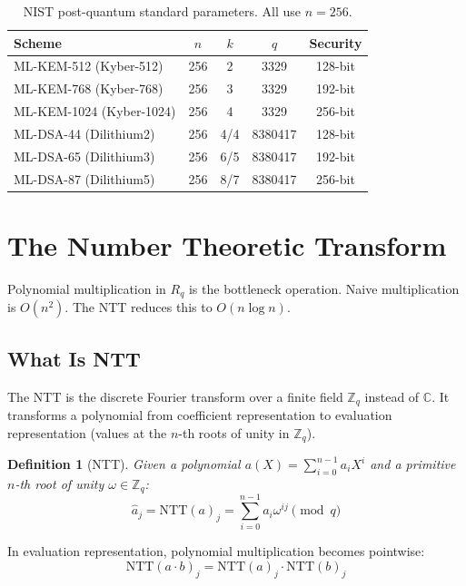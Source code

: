 \documentclass[11pt,a4paper]{article}
\newtheorem{definition}{Definition}
\begin{document}
\begin{table}[H]
\centering
\small
\begin{tabular}{@{}lcccc@{}}
\toprule
\textbf{Scheme} & $n$ & $k$ & $q$ & \textbf{Security} \\
\midrule
ML-KEM-512 (Kyber-512) & 256 & 2 & 3329 & 128-bit \\
ML-KEM-768 (Kyber-768) & 256 & 3 & 3329 & 192-bit \\
ML-KEM-1024 (Kyber-1024) & 256 & 4 & 3329 & 256-bit \\
ML-DSA-44 (Dilithium2) & 256 & 4/4 & 8380417 & 128-bit \\
ML-DSA-65 (Dilithium3) & 256 & 6/5 & 8380417 & 192-bit \\
ML-DSA-87 (Dilithium5) & 256 & 8/7 & 8380417 & 256-bit \\
\bottomrule
\end{tabular}
\caption{NIST post-quantum standard parameters. All use $n = 256$.}
\end{table}

\section{The Number Theoretic Transform}

Polynomial multiplication in $R_q$ is the bottleneck operation. Naive multiplication
is $O(n^2)$. The NTT reduces this to $O(n \log n)$.

\subsection{What Is NTT}

The NTT is the discrete Fourier transform over a finite field $\mathbb{Z}_q$ instead of
$\mathbb{C}$. It transforms a polynomial from coefficient representation to evaluation
representation (values at the $n$-th roots of unity in $\mathbb{Z}_q$).

\begin{definition}[NTT]
Given a polynomial $a(X) = \sum_{i=0}^{n-1} a_i X^i$ and a primitive $n$-th root of
unity $\omega \in \mathbb{Z}_q$:
\[
\hat{a}_j = \text{NTT}(a)_j = \sum_{i=0}^{n-1} a_i \omega^{ij} \pmod{q}
\]
\end{definition}

In evaluation representation, polynomial multiplication becomes pointwise:
\[
\text{NTT}(a \cdot b)_j = \text{NTT}(a)_j \cdot \text{NTT}(b)_j
\]
\end{document}
